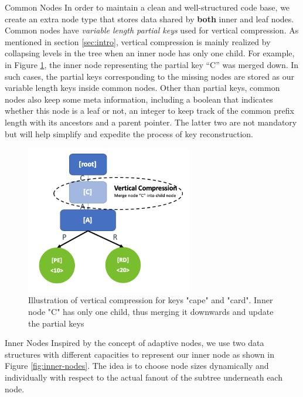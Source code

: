\documentclass[sigplan,screen,nonacm]{acmart}
\makeatletter
\def\subsubsection{\@startsection{subsubsection}{3}%
  \z@{.5\linespacing\@plus.7\linespacing}{.1\linespacing}%
  {\normalfont\itshape}}
\makeatother
\begin{document}
\subsubsection{Common Nodes}
In order to maintain a clean and well-structured code base, we create an extra node type that stores data shared by \textbf{both} inner and leaf nodes. Common nodes have {\itshape variable length partial keys} used for vertical compression. As mentioned in section \ref{sec:intro}, vertical compression is mainly realized by collapsing levels in the tree when an inner node has only one child. For example, in Figure \ref{fig:vertical-compression}, the inner node representing the partial key “C” was merged down. In such cases, the partial keys corresponding to the missing nodes are stored as our variable length keys inside common nodes. Other than partial keys, common nodes also keep some meta information, including a boolean that indicates whether this node is a leaf or not, an integer to keep track of the common prefix length with its ancestors and a parent pointer. The latter two are not mandatory but will help simplify and expedite the process of key reconstruction. 
\begin{figure}[t]
  \centering
  \includegraphics[width=\linewidth, height=6.5cm]{pic/vertical compression.png}
  \setlength{\belowcaptionskip}{-10pt} 
  \caption{Illustration of vertical compression for keys "cape" and "card". Inner node "C" has only one child, thus merging it downwards and update the partial keys}
  \label{fig:vertical-compression}
\end{figure}

\subsubsection{Inner Nodes}
\label{sec:inner-nodes}
Inspired by the concept of adaptive nodes, we use two data structures with different capacities to represent our inner node as shown in Figure \ref{fig:inner-nodes}. The idea is to choose node sizes dynamically and individually with respect to the actual fanout of the subtree underneath each node. 
\end{document}
